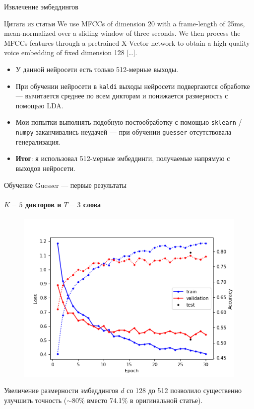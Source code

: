 \documentclass[aspectratio=169]{beamer}
\begin{document}
\begin{frame}{Извлечение эмбеддингов}
\begin{block}{Цитата из статьи}
    We use MFCCs of dimension 20 with a frame-length of 25ms, mean-normalized
    over a sliding window of three seconds. We then process the MFCCs features
    through a pretrained X-Vector network to obtain a high quality voice
    embedding of fixed dimension 128 [\ldots].
    \end{block}

    \begin{itemize}
        \item У данной нейросети есть только 512-мерные выходы.
        \item При обучении нейросети в \texttt{kaldi} выходы нейросети
              подвергаются обработке --- вычитается среднее по всем дикторам и
              понижается размерность с помощью LDA\@.
        \item Мои попытки выполнять подобную постообработку с помощью
              \texttt{sklearn} / \texttt{numpy} заканчивались неудачей --- при
              обучении \texttt{guesser} отсутствовала генерализация.
        \item \textbf{Итог}: я использовал 512-мерные эмбеддинги, получаемые
        напрямую с выходов нейросети.
    \end{itemize}
\end{frame}

\begin{frame}{Обучение Guesser --- первые результаты}
    \framesubtitle{$K = 5$ дикторов и $T = 3$ слова}
    \begin{figure}
        \centering
        \includegraphics[scale=0.4]{guesser_training_v1.png}
    \end{figure}

    Увеличение размерности эмбеддингов $d$ со 128 до 512 позволило существенно улучшить точность ($\sim$80\% вместо 74.1\% в оригинальной статье).
\end{frame}
\end{document}
